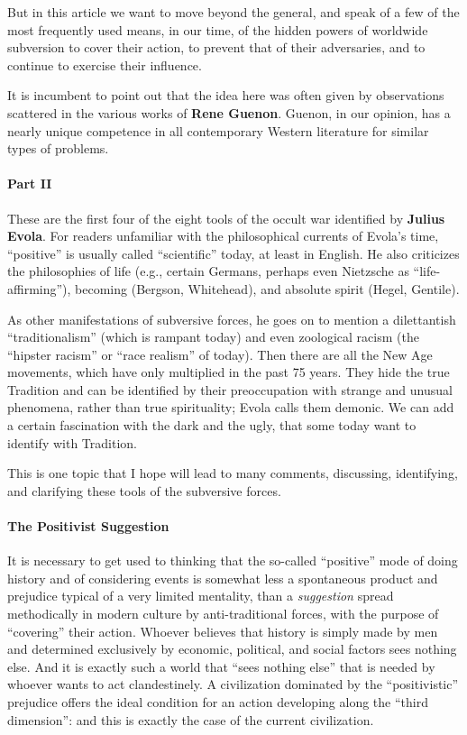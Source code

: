 But in this article we want to move beyond the general, and speak of a few of the most frequently used means, in our time, of the hidden powers of worldwide subversion to cover their action, to prevent that of their adversaries, and to continue to exercise their influence.

It is incumbent to point out that the idea here was often given by observations scattered in the various works of \textbf{Rene Guenon}. Guenon, in our opinion, has a nearly unique competence in all contemporary Western literature for similar types of problems.


\paragraph{Part II}

\begin{quotationx}
These are the first four of the eight tools of the occult war identified by \textbf{Julius Evola}. For readers unfamiliar with the philosophical currents of Evola's time, ``positive'' is usually called ``scientific'' today, at least in English. He also criticizes the philosophies of life (e.g., certain Germans, perhaps even Nietzsche as ``life-affirming''), becoming (Bergson, Whitehead), and absolute spirit (Hegel, Gentile).

As other manifestations of subversive forces, he goes on to mention a dilettantish ``traditionalism'' (which is rampant today) and even zoological racism (the ``hipster racism'' or ``race realism'' of today). Then there are all the New Age movements, which have only multiplied in the past 75 years. They hide the true Tradition and can be identified by their preoccupation with strange and unusual phenomena, rather than true spirituality; Evola calls them demonic. We can add a certain fascination with the dark and the ugly, that some today want to identify with Tradition.

This is one topic that I hope will lead to many comments, discussing, identifying, and clarifying these tools of the subversive forces.
\end{quotationx}


\paragraph{The Positivist Suggestion}


It is necessary to get used to thinking that the so-called ``positive'' mode of doing history and of considering events is somewhat less a spontaneous product and prejudice typical of a very limited mentality, than a \emph{suggestion} spread methodically in modern culture by anti-traditional forces, with the purpose of ``covering'' their action. Whoever believes that history is simply made by men and determined exclusively by economic, political, and social factors sees nothing else. And it is exactly such a world that ``sees nothing else'' that is needed by whoever wants to act clandestinely. A civilization dominated by the ``positivistic'' prejudice offers the ideal condition for an action developing along the ``third dimension'': and this is exactly the case of the current civilization.


